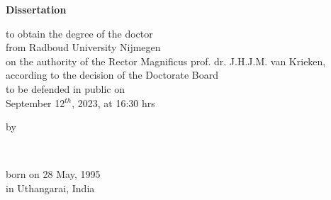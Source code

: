 \begin{titlepage}
    \begin{center}


        \vspace*{2\bigskipamount}

        {\makeatletter
            \titlestyle\bfseries\LARGE\@title
            \makeatother}

        {\makeatletter
            \ifx\@subtitle\undefined\else
                \bigskip
                \titlefont\titleshape\Large\@subtitle
            \fi
            \makeatother}

        \vfill


        {\Large\titlefont\bfseries Dissertation}

        \bigskip
        \bigskip

        to obtain the degree of the doctor\\
        from Radboud University Nijmegen\\
        on the authority of the Rector Magnificus prof. dr. J.H.J.M. van Krieken,\\
        according to the decision of the Doctorate Board\\
        to be defended in public on\\

        \bigskip
        September 12$^{th}$, 2023, at 16:30 hrs


        \bigskip
        \bigskip

        by

        \bigskip
        \bigskip

        \makeatletter
        {\Large\titlefont\bfseries\@firstnames\ \MakeUppercase{\titleshape\@lastname}}
        \makeatother

        \bigskip
        \bigskip

        born on 28 May, 1995\\
        in Uthangarai, India\\

        \vspace*{2\bigskipamount}

    \end{center}
    \clearpage


\end{titlepage}
